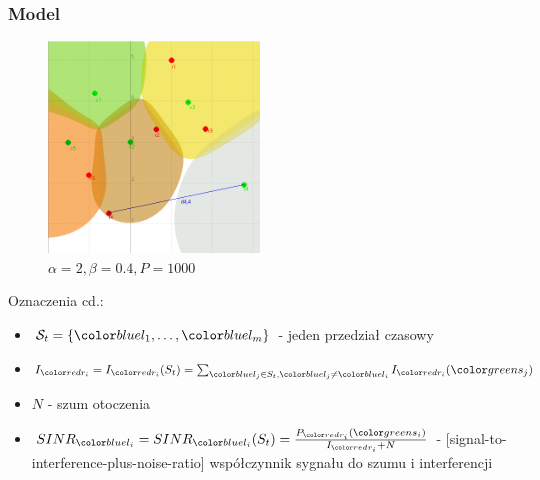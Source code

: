 \documentclass[polish, t,10pt]{beamer}
\begin{document}
    \begin{frame}
        \frametitle{Model}
        \begin{figure}
            \includegraphics[width=0.5\textwidth]{pictures/model-diagram2.png}
            \caption{$\alpha=2, \beta=0.4, P=1000$}
        \end{figure}
        Oznaczenia cd.:
        \begin{itemize}
            \item $\mathcal{S}_t = \{\lo, \ldots, \lm\}$ - jeden przedział czasowy
            \item $I_{\ri} = I_{\ri}(S_t) = \sum_{\lj \in S_t, \lj \neq \li} I_{\ri}(\sj)$
            \item $N$ - szum otoczenia
            \item $SINR_{\li} = SINR_{\li}(S_t) = \frac{P_{\ri}(\si)}{I_{\ri} + N}$ - [signal-to-interference-plus-noise-ratio] współczynnik sygnału do szumu i interferencji
        \end{itemize}
    \end{frame}
\end{document}
